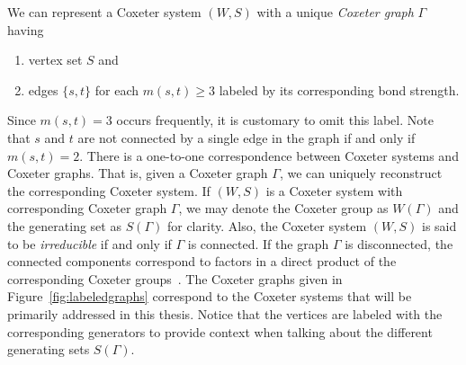 We can represent a Coxeter system $(W,S)$ with a unique \emph{Coxeter graph} $\Gamma$ having
\begin{enumerate}[leftmargin=2cm]
\item vertex set $S$ and
\item edges $\{s, t\}$ for each $m(s,t) \geq 3$ labeled by its corresponding bond strength.	
\end{enumerate}

Since $m(s,t)=3$ occurs frequently, it is customary to omit this label. Note that $s$ and $t$ are not connected by a single edge in the graph if and only if $m(s,t)=2$. There is a one-to-one correspondence between Coxeter systems and Coxeter graphs. That is, given a Coxeter graph $\Gamma$, we can uniquely reconstruct the corresponding Coxeter system. If $(W,S)$ is a Coxeter system with corresponding Coxeter graph $\Gamma$, we may denote the Coxeter group as $W(\Gamma)$ and the generating set as $S(\Gamma)$ for clarity. Also, the Coxeter system $(W,S)$ is said to be \emph{irreducible} if and only if $\Gamma$ is connected. If the graph $\Gamma$ is disconnected, the connected components correspond to factors in a direct product of the corresponding Coxeter groups~\cite{Humphreys1990}. The Coxeter graphs given in Figure~\ref{fig:labeledgraphs} correspond to the Coxeter systems that will be primarily addressed in this thesis. Notice that the vertices are labeled with the corresponding generators to provide context when talking about the different generating sets $S(\Gamma)$. 

